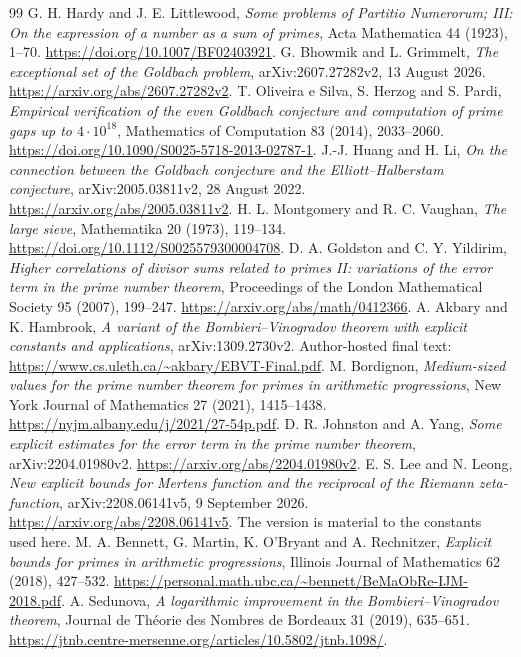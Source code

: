 \documentclass[11pt,a4paper]{article}
\theoremstyle{definition}
\theoremstyle{remark}
\begin{document}
\begin{thebibliography}{99}
 G. H. Hardy and J. E. Littlewood, \emph{Some problems of Partitio Numerorum; III: On the expression of a number as a sum of primes}, Acta Mathematica 44 (1923), 1--70. \url{https://doi.org/10.1007/BF02403921}.
 G. Bhowmik and L. Grimmelt, \emph{The exceptional set of the Goldbach problem}, arXiv:2607.27282v2, 13 August 2026. \url{https://arxiv.org/abs/2607.27282v2}.
 T. Oliveira e Silva, S. Herzog and S. Pardi, \emph{Empirical verification of the even Goldbach conjecture and computation of prime gaps up to $4\cdot10^{18}$}, Mathematics of Computation 83 (2014), 2033--2060. \url{https://doi.org/10.1090/S0025-5718-2013-02787-1}.
 J.-J. Huang and H. Li, \emph{On the connection between the Goldbach conjecture and the Elliott--Halberstam conjecture}, arXiv:2005.03811v2, 28 August 2022. \url{https://arxiv.org/abs/2005.03811v2}.
 H. L. Montgomery and R. C. Vaughan, \emph{The large sieve}, Mathematika 20 (1973), 119--134. \url{https://doi.org/10.1112/S0025579300004708}.
 D. A. Goldston and C. Y. Yildirim, \emph{Higher correlations of divisor sums related to primes II: variations of the error term in the prime number theorem}, Proceedings of the London Mathematical Society 95 (2007), 199--247. \url{https://arxiv.org/abs/math/0412366}.
 A. Akbary and K. Hambrook, \emph{A variant of the Bombieri--Vinogradov theorem with explicit constants and applications}, arXiv:1309.2730v2. Author-hosted final text: \url{https://www.cs.uleth.ca/~akbary/EBVT-Final.pdf}.
 M. Bordignon, \emph{Medium-sized values for the prime number theorem for primes in arithmetic progressions}, New York Journal of Mathematics 27 (2021), 1415--1438. \url{https://nyjm.albany.edu/j/2021/27-54p.pdf}.
 D. R. Johnston and A. Yang, \emph{Some explicit estimates for the error term in the prime number theorem}, arXiv:2204.01980v2. \url{https://arxiv.org/abs/2204.01980v2}.
 E. S. Lee and N. Leong, \emph{New explicit bounds for Mertens function and the reciprocal of the Riemann zeta-function}, arXiv:2208.06141v5, 9 September 2026. \url{https://arxiv.org/abs/2208.06141v5}. The version is material to the constants used here.
 M. A. Bennett, G. Martin, K. O'Bryant and A. Rechnitzer, \emph{Explicit bounds for primes in arithmetic progressions}, Illinois Journal of Mathematics 62 (2018), 427--532. \url{https://personal.math.ubc.ca/~bennett/BeMaObRe-IJM-2018.pdf}.
 A. Sedunova, \emph{A logarithmic improvement in the Bombieri--Vinogradov theorem}, Journal de Th\'eorie des Nombres de Bordeaux 31 (2019), 635--651. \url{https://jtnb.centre-mersenne.org/articles/10.5802/jtnb.1098/}.

\end{thebibliography}
\end{document}
